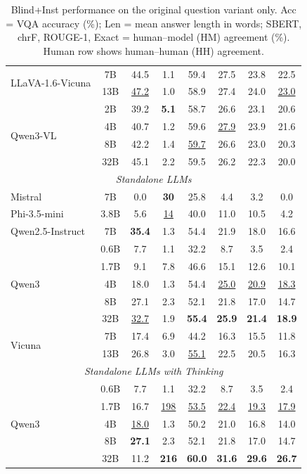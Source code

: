 \begin{table}[t]
{\begin{tabular}{lc|cccccc}
\multirow{2}{*}{LLaVA-1.6-Vicuna} & 7B & 44.5 & 1.1 & 59.4 & 27.5 & 23.8 & 22.5 \\
 & 13B & \underline{47.2} & 1.0 & 58.9 & 27.4 & 24.0 & \underline{23.0} \\
\multirow{4}{*}{Qwen3-VL} & 2B & 39.2 & \textbf{5.1} & 58.7 & 26.6 & 23.1 & 20.6 \\
 & 4B & 40.7 & 1.2 & 59.6 & \underline{27.9} & 23.9 & 21.6 \\
 & 8B & 42.2 & 1.4 & \underline{59.7} & 26.6 & 23.0 & 20.3 \\
 & 32B & 45.1 & 2.2 & 59.5 & 26.2 & 22.3 & 20.0 \\
\midrule
\multicolumn{8}{c}{\textit{Standalone LLMs}} \\
\midrule
Mistral & 7B & 0.0 & \textbf{30} & 25.8 & 4.4 & 3.2 & 0.0 \\
Phi-3.5-mini & 3.8B & 5.6 & \underline{14} & 40.0 & 11.0 & 10.5 & 4.2 \\
Qwen2.5-Instruct & 7B & \textbf{35.4} & 1.3 & 54.4 & 21.9 & 18.0 & 16.6 \\
\multirow{5}{*}{Qwen3} & 0.6B & 7.7 & 1.1 & 32.2 & 8.7 & 3.5 & 2.4 \\
 & 1.7B & 9.1 & 7.8 & 46.6 & 15.1 & 12.6 & 10.1 \\
 & 4B & 18.0 & 1.3 & 54.4 & \underline{25.0} & \underline{20.9} & \underline{18.3} \\
 & 8B & 27.1 & 2.3 & 52.1 & 21.8 & 17.0 & 14.7 \\
 & 32B & \underline{32.7} & 1.9 & \textbf{55.4} & \textbf{25.9} & \textbf{21.4} & \textbf{18.9} \\
\multirow{2}{*}{Vicuna} & 7B & 17.4 & 6.9 & 44.2 & 16.3 & 15.5 & 11.8 \\
 & 13B & 26.8 & 3.0 & \underline{55.1} & 22.5 & 20.5 & 16.3 \\
\midrule
\multicolumn{8}{c}{\textit{Standalone LLMs with Thinking}} \\
\midrule
\multirow{5}{*}{Qwen3} & 0.6B & 7.7 & 1.1 & 32.2 & 8.7 & 3.5 & 2.4 \\
 & 1.7B & 16.7 & \underline{198} & \underline{53.5} & \underline{22.4} & \underline{19.3} & \underline{17.9} \\
 & 4B & \underline{18.0} & 1.3 & 50.2 & 21.0 & 16.8 & 14.0 \\
 & 8B & \textbf{27.1} & 2.3 & 52.1 & 21.8 & 17.0 & 14.7 \\
 & 32B & 11.2 & \textbf{216} & \textbf{60.0} & \textbf{31.6} & \textbf{29.6} & \textbf{26.7} \\
\bottomrule
\end{tabular}
}
\caption{\small Blind+Inst performance on the original question variant only. Acc = VQA accuracy (\%); Len = mean answer length in words; SBERT, chrF, ROUGE-1, Exact = human--model (HM) agreement (\%). Human row shows human--human (HH) agreement.}
\label{tab:comprehensive_inst_blind_vc_w5}
\end{table}
